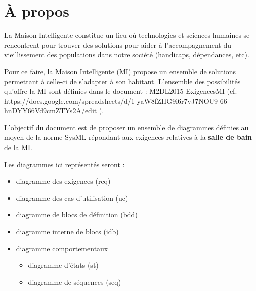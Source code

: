 \chapter*{À propos}

La Maison Intelligente constitue un lieu où technologies et sciences humaines se rencontrent pour trouver des solutions pour aider à l'accompagnement du vieillissement des populations dans notre société (handicaps, dépendances, etc).
 
Pour ce faire, la Maison Intelligente (MI) propose un ensemble de solutions permettant à celle-ci de s'adapter à son habitant.  L'ensemble des possibilités qu'offre la MI sont définies dans le document : M2DL2015-ExigencesMI (cf. https://docs.google.com/spreadsheets/d/1-yaW8fZHG9i6r7vJ7NOU9-66-hnDYY66Vd9cmZTYs2A/edit ). 

L'objectif du document est de proposer un ensemble de diagrammes définies au moyen de la norme SysML répondant aux exigences relatives à la \textbf{salle de bain} de la MI.

Les diagrammes ici représentés seront :
\begin{itemize}
	\item diagramme des exigences (req)
	\item diagramme des cas d'utilisation (uc)
	\item diagramme de blocs de définition (bdd)
	\item diagramme interne de blocs (idb)
	\item diagramme comportementaux
	\begin{itemize}
		\item diagramme d'états (st)
		\item diagramme de séquences (seq)
	\end{itemize}
\end{itemize} 